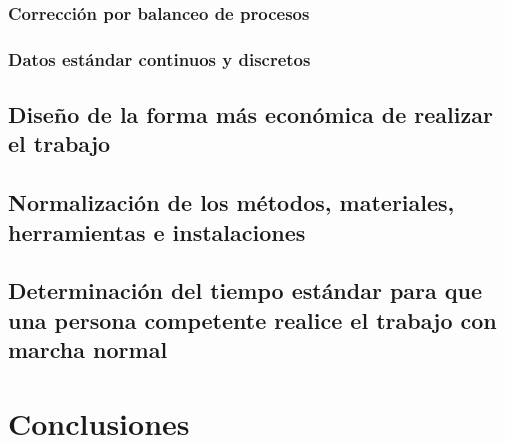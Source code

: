     \subsubsection{Corrección por balanceo de procesos}
    \subsubsection{Datos estándar continuos y discretos}
    \subsection{Diseño de la forma más económica de realizar el trabajo}
    
    \subsection{Normalización de los métodos, materiales, herramientas e instalaciones}
    
    \subsection{Determinación del tiempo estándar para que una persona competente realice el trabajo con marcha normal}
    
    
    
    
    \section{Conclusiones}
    
